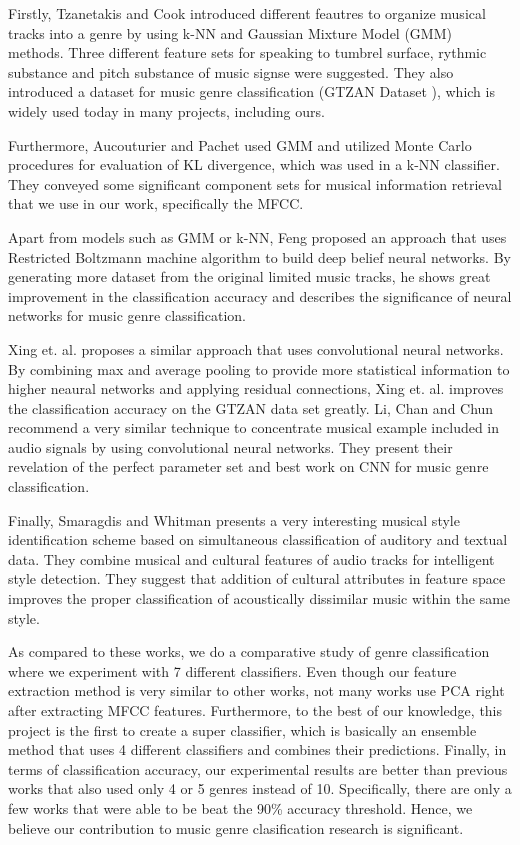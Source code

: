 Firstly, Tzanetakis and Cook \cite{GTZAN:2002} introduced different feautres to organize musical tracks into a genre by using k-NN and Gaussian Mixture Model (GMM) methods. Three different feature sets for speaking to tumbrel surface, rythmic substance and pitch substance of music signse were suggested. They also introduced a dataset for music genre classification (GTZAN Dataset \cite{GTZAN:2002}), which is widely used today in many projects, including ours. 

Furthermore, Aucouturier and Pachet \cite{Pachet:2003} used GMM and utilized Monte Carlo procedures for evaluation of KL divergence, which was used in a k-NN classifier. They conveyed some significant component sets for musical information retrieval that we use in our work, specifically the MFCC. 

Apart from models such as GMM or k-NN, Feng \cite{Feng:2016} proposed an approach that uses Restricted Boltzmann machine algorithm to build deep belief neural networks. By generating more dataset from the original limited music tracks, he shows great improvement in the classification accuracy and describes the significance of neural networks for music genre classification. 

Xing et. al. \cite{Xing:2016} proposes a similar approach that uses convolutional neural networks. By combining max and average pooling to provide more statistical information to higher neaural networks and applying residual connections, Xing et. al. \cite{Xing:2016} improves the classification accuracy on the GTZAN data set greatly. Li, Chan and Chun \cite{Chun:2010} recommend a very similar technique to concentrate musical example included in audio signals by using convolutional neural networks. They present their revelation of the perfect parameter set and best work on CNN for music genre classification.

Finally, Smaragdis and Whitman \cite{Smaragdis:2002} presents a very interesting musical style identification scheme based on simultaneous classification of auditory and textual data. They combine musical and cultural features of audio tracks for intelligent style detection. They suggest that addition of cultural attributes in feature space improves the proper classification of acoustically dissimilar music within the same style.

As compared to these works, we do a comparative study of genre classification where we experiment with 7 different classifiers. Even though our feature extraction method is very similar to other works, not many works use PCA right after extracting MFCC features. Furthermore, to the best of our knowledge, this project is the first to create a super classifier, which is basically an ensemble method that uses 4 different classifiers and combines their predictions. Finally, in terms of classification accuracy, our experimental results are better than previous works that also used only 4 or 5 genres instead of 10. Specifically, there are only a few works that were able to be beat the 90\% accuracy threshold. Hence, we believe our contribution to music genre clasification research is significant.  

